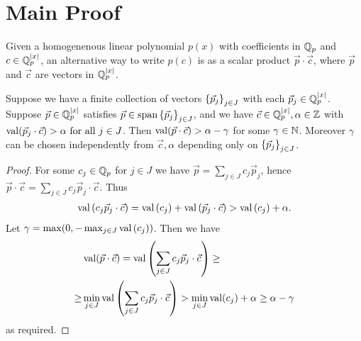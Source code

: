 \documentclass{amsart}
\begin{document}

\section{Main Proof}
Given a homogenenous linear polynomial $p(x)$ with coefficients in $\mathbb{Q}_p$ and $c \in \mathbb{Q}_p^{|x|}$,
an alternative way to write $p(c)$ is as a scalar product $\vec p \cdot \vec c$,
where $\vec p$ and $\vec c$ are vectors in $\mathbb{Q}_p^{|x|}$.%

\begin{Lemma}	 
  Suppose we have a finite collection of vectors $\left\{\vec p_j\right\}_{j \in J}$ with each $\vec p_j \in \mathbb{Q}_p^{|x|}$.
  Suppose $\vec p \in \mathbb{Q}_p^{|x|}$ satisfies $\vec p \in \operatorname{span} \left\{\vec p_j\right\}_{j \in J}$,
  and we have $\vec c \in \mathbb{Q}_p^{|x|}, \alpha \in \mathbb{Z}$ with $\operatorname{val}(\vec p_j \cdot \vec c) > \alpha \text{ for all } j \in J$.
  Then $\operatorname{val}(\vec p \cdot \vec c) > \alpha - \gamma$ for some $\gamma \in \mathbb{N}$.
  Moreover $\gamma$ can be chosen independently from $\vec c, \alpha$ depending only on $\left\{\vec p_j\right\}_{j \in J}$.
\end{Lemma}

\begin{proof}
  For some $c_j \in \mathbb{Q}_p$ for $j \in J$ we have $\vec p = \sum_{j \in J} c_j \vec p_j$,
  hence $\vec p \cdot \vec c = \sum_{j \in J} c_j \vec p_j \cdot \vec c$.
  Thus
  \begin{align*}
    \operatorname{val} \left(c_j \vec p_j \cdot \vec c\right) = \operatorname{val} \left(c_j\right) + \operatorname{val} \left(\vec p_j \cdot \vec c\right) > \operatorname{val} \left(c_j\right) + \alpha.
  \end{align*}
  Let $\gamma = \max(0, -\max_{j \in J} \operatorname{val} \left(c_j\right))$.
  Then we have 
  \begin{align*}
    &\operatorname{val}(\vec p \cdot \vec c) =
      \operatorname{val} \left(\sum_{j \in J} c_j \vec p_j \cdot \vec c\right) \geq \\
      \geq &\min_{j \in J} \operatorname{val}\left(\sum_{j \in J} c_j \vec p_j \cdot \vec c\right) >
      \min_{j \in J} \operatorname{val}(c_j) + \alpha \geq
      \alpha - \gamma
  \end{align*}
  as required.
\end{proof}
\end{document}
